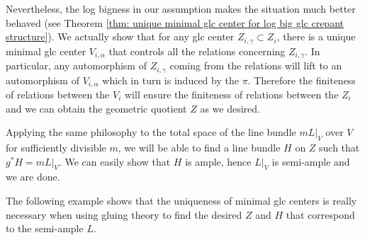 \documentclass[11pt]{amsart}
\numberwithin{equation}{section}
\theoremstyle{definition}
\theoremstyle{definition}
\theoremstyle{definition}
\begin{document}
Nevertheless, the log bigness in our assumption makes the situation much better behaved (see Theorem \ref{thm: unique minimal glc center for log big glc crepant structure}). We actually show that for any glc center $Z_{i,\gamma}\subset Z_i$, there is a unique minimal glc center $V_{i,\alpha}$ that controls all the relations concerning $Z_{i,\gamma}$. In particular, any automorphism of $Z_{i,\gamma}$ coming from the relations will lift to an automorphism of $V_{i,\alpha}$ which in turn is induced by the $\pi$. Therefore the finiteness of relations between the $V_i$ will ensure the finiteness of relations between the $Z_i$ and we can obtain the geometric quotient $Z$ as we desired.

Applying the same philosophy to the total space of the line bundle $mL|_V$ over $V$ for sufficiently divisible $m$, we will be able to find a line bundle $H$ on $Z$ such that $g^*H=mL|_V$. We can easily show that $H$ is ample, hence $L|_V$ is semi-ample and we are done.

\vspace{1em}
The following example shows that the uniqueness of minimal glc centers is really necessary when using gluing theory to find the desired $Z$ and $H$ that correspond to the semi-ample $L$.
\end{document}
